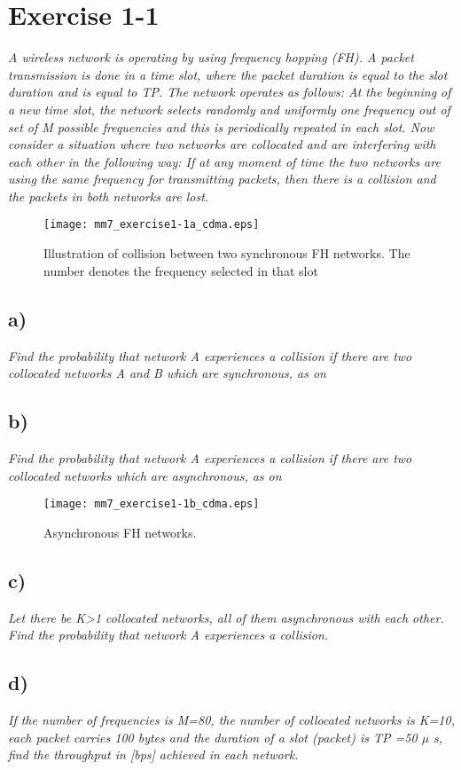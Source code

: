 \section{Exercise 1-1} \label{sec:mm7_Ex1}
\textit{A wireless network is operating by using frequency hopping (FH). A packet transmission is done in a time slot, where the packet duration is equal to the slot duration and is equal to TP. The network operates as follows: At the beginning of a new time slot, the network selects randomly and uniformly one frequency out of set of M possible frequencies and this is periodically repeated in each slot. Now consider a situation where two networks are collocated and are interfering with each other in the following way: If at any moment of time the two networks are using the same frequency for transmitting packets, then there is a collision and the packets in both networks are lost.}
\begin{figure}[!h]
  \centering
  \texttt{[image: mm7\_exercise1-1a\_cdma.eps]}
  \caption{Illustration of collision between two synchronous FH networks. The number denotes the frequency selected in that slot}
  \label{fig:mm7_exercise1-1a_cdma}
\end{figure}

\subsection{a)}
\textit{Find the probability that network A experiences a collision if there are two collocated networks A and B which are synchronous, as on }


\subsection{b)}
\textit{Find the probability that network A experiences a collision if there are two collocated networks which are asynchronous, as on }
\begin{figure}[!h]
  \centering
  \texttt{[image: mm7\_exercise1-1b\_cdma.eps]}
  \caption{Asynchronous FH networks.}
  \label{fig:mm7_exercise1-1b_cdma}
\end{figure}

\subsection{c)}
\textit{Let there be K>1 collocated networks, all of them asynchronous with each other. Find the probability that network A experiences a collision.}


\subsection{d)}
\textit{If the number of frequencies is M=80, the number of collocated networks is K=10, each packet carries 100 bytes and the duration of a slot (packet) is TP =50 $\mu$ s, find the throughput in [bps] achieved in each network.}
